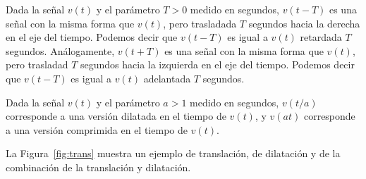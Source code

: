 \documentclass[paper=letter, fontsize=11pt]{scrartcl}
\begin{document}
Dada la señal $v(t)$ y el parámetro $T > 0$ medido en segundos, $v(t-T)$ es una
señal con la misma forma que $v(t)$, pero trasladada $T$ segundos hacia la
derecha en el eje del tiempo. Podemos decir que $v(t-T)$ es igual a $v(t)$
retardada $T$ segundos. Análogamente, $v(t + T)$ es una señal con la misma
forma que $v(t)$, pero trasladad $T$ segundos hacia la izquierda en el eje del
tiempo. Podemos decir que $v(t-T)$ es igual a $v(t)$ adelantada $T$ segundos.


Dada la señal $v(t)$ y el parámetro $a > 1$ medido en segundos, $v(t/a)$
corresponde a una versión dilatada en el tiempo de $v(t)$, y $v(at)$
corresponde a una versión comprimida en el tiempo de $v(t)$.


La Figura~\ref{fig:trans} muestra un ejemplo de translación, de dilatación y de
la combinación de la translación y dilatación.
\end{document}
